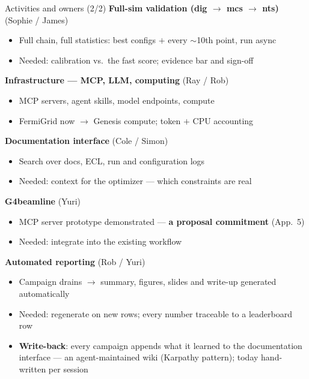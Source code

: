 \documentclass[aspectratio=169,10pt]{beamer}
\begin{document}
\begin{frame}{Activities and owners (2/2)}
\small
\textbf{Full-sim validation (dig $\rightarrow$ mcs $\rightarrow$ nts)} \hfill \textcolor{fnalblue}{(Sophie / James)}
\begin{itemize}\scriptsize
  \item Full chain, full statistics: best configs $+$ every $\sim$10th point, run async
  \item Needed: calibration vs.\ the fast score; evidence bar and sign-off
\end{itemize}
\vspace{0.6em}

\textbf{Infrastructure --- MCP, LLM, computing} \hfill \textcolor{fnalblue}{(Ray / Rob)}
\begin{itemize}\scriptsize
  \item MCP servers, agent skills, model endpoints, compute
  \item FermiGrid now $\rightarrow$ Genesis compute; token $+$ CPU accounting
\end{itemize}
\vspace{0.6em}

\textbf{Documentation interface} \hfill \textcolor{fnalblue}{(Cole / Simon)}
\begin{itemize}\scriptsize
  \item Search over docs, ECL, run and configuration logs
  \item Needed: context for the optimizer --- which constraints are real
\end{itemize}
\vspace{0.6em}

\textbf{G4beamline} \hfill \textcolor{fnalblue}{(Yuri)}
\begin{itemize}\scriptsize
  \item MCP server prototype demonstrated --- \textbf{a proposal commitment} (App.\ 5)
  \item Needed: integrate into the existing workflow
\end{itemize}
\vspace{0.15em}

\textbf{Automated reporting} \hfill \textcolor{fnalblue}{(Rob / Yuri)}
\begin{itemize}\scriptsize
  \item Campaign drains $\rightarrow$ summary, figures, slides and write-up generated automatically
  \item Needed: regenerate on new rows; every number traceable to a leaderboard row
  \item \textbf{Write-back}: every campaign appends what it learned to the documentation interface --- an agent-maintained wiki (Karpathy pattern); today hand-written per session
\end{itemize}

\end{frame}
\end{document}
